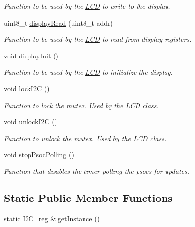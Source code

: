 \begin{DoxyCompactItemize}
\begin{DoxyCompactList}\small\item\em Function to be used by the \hyperlink{class_l_c_d}{L\+CD} to write to the display. \end{DoxyCompactList}\item 
uint8\+\_\+t \hyperlink{class_i2_c__reg_a09a60c49f946406d98754966473110a5}{display\+Read} (uint8\+\_\+t addr)
\begin{DoxyCompactList}\small\item\em Function to be used by the \hyperlink{class_l_c_d}{L\+CD} to read from display registers. \end{DoxyCompactList}\item 
void \hyperlink{class_i2_c__reg_afb752ee0655db95f5b54c99a351cb574}{display\+Init} ()
\begin{DoxyCompactList}\small\item\em Function to be used by the \hyperlink{class_l_c_d}{L\+CD} to initialize the display. \end{DoxyCompactList}\item 
void \hyperlink{class_i2_c__reg_abf7f9d0cb3ba7f175f88521c6c865ce9}{lock\+I2C} ()
\begin{DoxyCompactList}\small\item\em Function to lock the mutex. Used by the \hyperlink{class_l_c_d}{L\+CD} class. \end{DoxyCompactList}\item 
void \hyperlink{class_i2_c__reg_a031bc853a788721fea14a98e9ab4c06c}{unlock\+I2C} ()
\begin{DoxyCompactList}\small\item\em Function to unlock the mutex. Used by the \hyperlink{class_l_c_d}{L\+CD} class. \end{DoxyCompactList}\item 
void \hyperlink{class_i2_c__reg_af5483b482bc8129b9d460a570789528b}{stop\+Psoc\+Polling} ()
\begin{DoxyCompactList}\small\item\em Function that disables the timer polling the psocs for updates. \end{DoxyCompactList}\end{DoxyCompactItemize}
\subsection*{Static Public Member Functions}
\begin{DoxyCompactItemize}
\item 
static \hyperlink{class_i2_c__reg}{I2\+C\+\_\+reg} \& \hyperlink{class_i2_c__reg_a1fbc3ac094e2b64324f91019c9fa68e1}{get\+Instance} ()
\end{DoxyCompactItemize}
